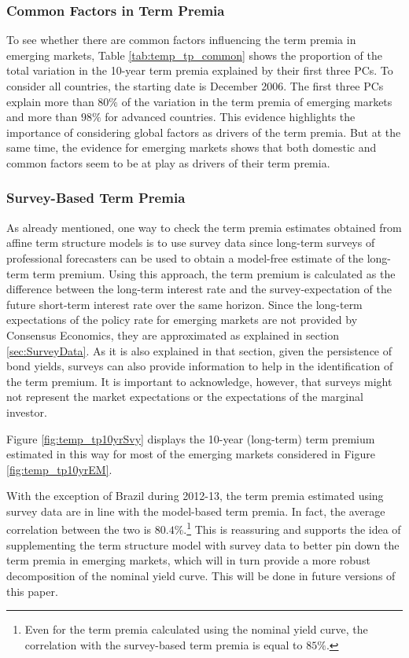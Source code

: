 {\subsubsection{Common Factors in Term Premia}
To see whether there are common factors influencing the term premia in emerging markets, Table \ref{tab:temp_tp_common} shows the proportion of the total variation in the 10-year term premia explained by their first three PCs. To consider all countries, the starting date is December 2006. The first three PCs explain more than $80\%$ of the variation in the term premia of emerging markets and more than $98\%$ for advanced countries. This evidence highlights the importance of considering global factors as drivers of the term premia. But at the same time, the evidence for emerging markets shows that both domestic and common factors seem to be at play as drivers of their term premia.
%	
%	
	

\subsubsection{Survey-Based Term Premia}
As already mentioned, one way to check the term premia estimates obtained from affine term structure models is to use survey data since long-term surveys of professional forecasters can be used to obtain a model-free estimate of the long-term term premium. Using this approach, the term premium is calculated as the difference between the long-term interest rate and the survey-expectation of the future short-term interest rate over the same horizon. Since the long-term expectations of the policy rate for emerging markets are not provided by Consensus Economics, they are approximated as explained in section \ref{sec:SurveyData}. As it is also explained in that section, given the persistence of bond yields, surveys can also provide information to help in the identification of the term premium.
 It is important to acknowledge, however, that surveys might not represent the market expectations or the expectations of the marginal investor.

Figure \ref{fig:temp_tp10yrSvy} displays the 10-year (long-term) term premium estimated in this way for most of the emerging markets considered in Figure \ref{fig:temp_tp10yrEM}.
	

With the exception of Brazil during 2012-13, the term premia estimated using survey data are in line with the model-based term premia. In fact, the average correlation between the two is $80.4\%$.\footnote{Even for the term premia calculated using the nominal yield curve, the correlation with the survey-based term premia is equal to $85\%$.} This is reassuring and supports the idea of supplementing the term structure model with survey data to better pin down the term premia in emerging markets, which will in turn provide a more robust decomposition of the nominal yield curve. This will be done in future versions of this paper.

}{}	%


